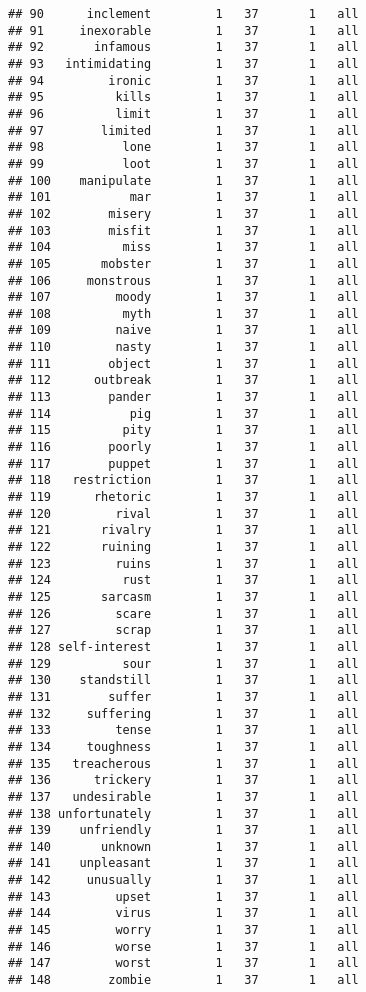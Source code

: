 \documentclass[
]{article}
\begin{document}
\begin{verbatim}
## 90      inclement         1   37       1   all
## 91     inexorable         1   37       1   all
## 92       infamous         1   37       1   all
## 93   intimidating         1   37       1   all
## 94         ironic         1   37       1   all
## 95          kills         1   37       1   all
## 96          limit         1   37       1   all
## 97        limited         1   37       1   all
## 98           lone         1   37       1   all
## 99           loot         1   37       1   all
## 100    manipulate         1   37       1   all
## 101           mar         1   37       1   all
## 102        misery         1   37       1   all
## 103        misfit         1   37       1   all
## 104          miss         1   37       1   all
## 105       mobster         1   37       1   all
## 106     monstrous         1   37       1   all
## 107         moody         1   37       1   all
## 108          myth         1   37       1   all
## 109         naive         1   37       1   all
## 110         nasty         1   37       1   all
## 111        object         1   37       1   all
## 112      outbreak         1   37       1   all
## 113        pander         1   37       1   all
## 114           pig         1   37       1   all
## 115          pity         1   37       1   all
## 116        poorly         1   37       1   all
## 117        puppet         1   37       1   all
## 118   restriction         1   37       1   all
## 119      rhetoric         1   37       1   all
## 120         rival         1   37       1   all
## 121       rivalry         1   37       1   all
## 122       ruining         1   37       1   all
## 123         ruins         1   37       1   all
## 124          rust         1   37       1   all
## 125       sarcasm         1   37       1   all
## 126         scare         1   37       1   all
## 127         scrap         1   37       1   all
## 128 self-interest         1   37       1   all
## 129          sour         1   37       1   all
## 130    standstill         1   37       1   all
## 131        suffer         1   37       1   all
## 132     suffering         1   37       1   all
## 133         tense         1   37       1   all
## 134     toughness         1   37       1   all
## 135   treacherous         1   37       1   all
## 136      trickery         1   37       1   all
## 137   undesirable         1   37       1   all
## 138 unfortunately         1   37       1   all
## 139    unfriendly         1   37       1   all
## 140       unknown         1   37       1   all
## 141    unpleasant         1   37       1   all
## 142     unusually         1   37       1   all
## 143         upset         1   37       1   all
## 144         virus         1   37       1   all
## 145         worry         1   37       1   all
## 146         worse         1   37       1   all
## 147         worst         1   37       1   all
## 148        zombie         1   37       1   all
\end{verbatim}
\end{document}
